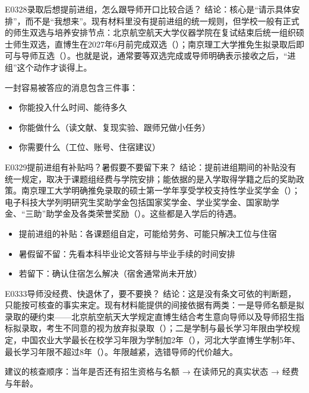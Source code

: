 \begin{qa}{E0328}{录取后想提前进组，怎么跟导师开口比较合适？}
结论：核心是“请示具体安排”，而不是“我想来”。现有材料里没有提前进组的统一规则，但学校一般有正式的师生双选与培养安排节点：北京航空航天大学仪器学院在复试结束后统一组织硕士师生双选，直博生在2027年6月前完成双选（）；南京理工大学推免生拟录取后即可与导师互选（）。也就是说，通常要等双选完成或导师明确表示接收之后，“进组”这个动作才谈得上。

一封容易被答应的消息包含三件事：
\begin{itemize}
  \item 你能投入什么时间、能待多久
  \item 你能做什么（读文献、复现实验、跟师兄做小任务）
  \item 你需要什么（工位、账号、住宿建议）
\end{itemize}
\end{qa}

\begin{qa}{E0329}{提前进组有补贴吗？暑假要不要留下来？}
结论：提前进组期间的补贴没有统一规定，取决于课题组经费与学院安排；能依据的是入学取得学籍之后的奖助政策。南京理工大学明确推免录取的硕士第一学年享受学校支持性学业奖学金（）；电子科技大学列明研究生奖助学金包括国家奖学金、学业奖学金、国家助学金、“三助”助学金及各类荣誉奖励（）。这些都是入学后的待遇。

\begin{itemize}
  \item 提前进组的补贴：各课题组自定，可能给劳务、可能只解决工位与住宿
  \item 暑假留不留：先看本科毕业论文答辩与毕业手续的时间安排
  \item 若留下：确认住宿怎么解决（宿舍通常尚未开放）
\end{itemize}
\end{qa}

\begin{qa}{E0333}{导师没经费、快退休了，要不要换？}
结论：这是没有条文可依的判断题，只能按可核查的事实来定。现有材料能提供的间接依据有两类：一是导师名额是拟录取的硬约束——北京航空航天大学规定直博生结合考生意向导师以及导师招生指标拟录取，考生不同意的视为放弃拟录取（）；二是学制与最长学习年限由学校规定，中国农业大学最长在校学习年限为学制加2年（），河北大学直博生学制5年、最长学习年限不超过8年（）。年限越紧，选错导师的代价越大。

建议的核查顺序：当年是否还有招生资格与名额 → 在读师兄的真实状态 → 经费与年龄。
\end{qa}

